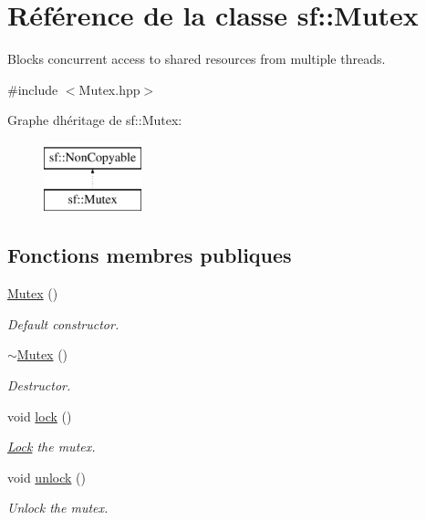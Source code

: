 \hypertarget{classsf_1_1Mutex}{}\section{Référence de la classe sf\+:\+:Mutex}
\label{classsf_1_1Mutex}


Blocks concurrent access to shared resources from multiple threads.  




{\ttfamily \#include $<$Mutex.\+hpp$>$}

Graphe d\textquotesingle{}héritage de sf\+:\+:Mutex\+:\begin{figure}[H]
\begin{center}
\leavevmode
\includegraphics[height=2.000000cm]{classsf_1_1Mutex}
\end{center}
\end{figure}
\subsection*{Fonctions membres publiques}
\begin{DoxyCompactItemize}
\item 
\mbox{\label{classsf_1_1Mutex_a9bd52a48320fd7b6db8a78037aad276e}} 
\hyperlink{classsf_1_1Mutex_a9bd52a48320fd7b6db8a78037aad276e}{Mutex} ()
\begin{DoxyCompactList}\small\item\em Default constructor. \end{DoxyCompactList}\item 
\mbox{\label{classsf_1_1Mutex_a9f76a67b7b6d3918131a692179b4e3f2}} 
\hyperlink{classsf_1_1Mutex_a9f76a67b7b6d3918131a692179b4e3f2}{$\sim$\+Mutex} ()
\begin{DoxyCompactList}\small\item\em Destructor. \end{DoxyCompactList}\item 
void \hyperlink{classsf_1_1Mutex_a1a16956a6bbea764480c1b80f2e45763}{lock} ()
\begin{DoxyCompactList}\small\item\em \hyperlink{classsf_1_1Lock}{Lock} the mutex. \end{DoxyCompactList}\item 
void \hyperlink{classsf_1_1Mutex_ade71268ffc5e80756652058b01c23c33}{unlock} ()
\begin{DoxyCompactList}\small\item\em Unlock the mutex. \end{DoxyCompactList}\end{DoxyCompactItemize}


